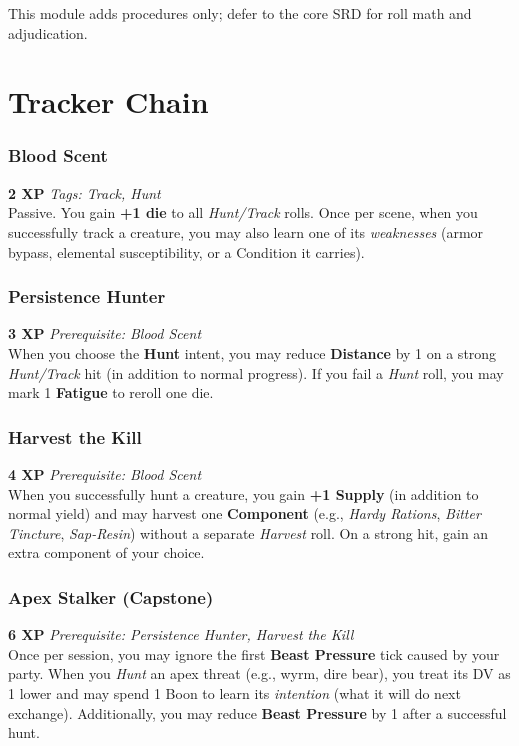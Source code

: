 \documentclass[11pt]{article}
\begin{document}
\begin{center}\small This module adds procedures only; defer to the core SRD for roll math and adjudication.\end{center}

\appendix
\section{Tracker Chain}

\subsubsection{Blood Scent}
\textbf{2 XP} \hfill \textit{Tags: Track, Hunt}\\
Passive. You gain \textbf{+1 die} to all \emph{Hunt/Track} rolls. Once per scene, when you successfully track a creature, you may also learn one of its \textit{weaknesses} (armor bypass, elemental susceptibility, or a Condition it carries).

\subsubsection{Persistence Hunter}
\textbf{3 XP} \hfill \textit{Prerequisite: Blood Scent}\\
When you choose the \textbf{Hunt} intent, you may reduce \textbf{Distance} by 1 on a strong \emph{Hunt/Track} hit (in addition to normal progress). If you fail a \emph{Hunt} roll, you may mark 1 \textbf{Fatigue} to reroll one die.

\subsubsection{Harvest the Kill}
\textbf{4 XP} \hfill \textit{Prerequisite: Blood Scent}\\
When you successfully hunt a creature, you gain \textbf{+1 Supply} (in addition to normal yield) and may harvest one \textbf{Component} (e.g., \emph{Hardy Rations}, \emph{Bitter Tincture}, \emph{Sap-Resin}) without a separate \emph{Harvest} roll. On a strong hit, gain an extra component of your choice.

\subsubsection{Apex Stalker (Capstone)}
\textbf{6 XP} \hfill \textit{Prerequisite: Persistence Hunter, Harvest the Kill}\\
Once per session, you may ignore the first \textbf{Beast Pressure} tick caused by your party. When you \emph{Hunt} an apex threat (e.g., wyrm, dire bear), you treat its DV as 1 lower and may spend 1 Boon to learn its \textit{intention} (what it will do next exchange). Additionally, you may reduce \textbf{Beast Pressure} by 1 after a successful hunt.
\end{document}
